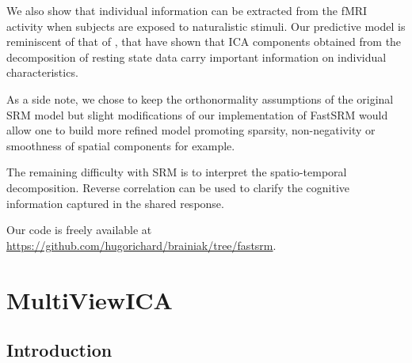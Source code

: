 \documentclass{report}
\begin{document}
{We also show that individual information can be extracted from the fMRI activity when subjects are exposed to naturalistic stimuli. Our predictive model is reminiscent of that of \cite{bijsterbosch2018relationship}, that have shown that ICA components obtained from the decomposition of resting state data carry important information on individual characteristics. 
%

As a side note, we chose to keep the orthonormality assumptions of the original SRM model but slight modifications of our implementation of FastSRM would allow one to build more refined model promoting sparsity, non-negativity or smoothness of spatial components for example.

The remaining difficulty with SRM is to interpret the spatio-temporal decomposition. Reverse correlation \cite{hasson2004intersubject} can be used to clarify the cognitive information captured in the shared response.

Our code is freely available at \url{https://github.com/hugorichard/brainiak/tree/fastsrm}.



\chapter{MultiViewICA}
\section{Introduction}

}
\end{document}

